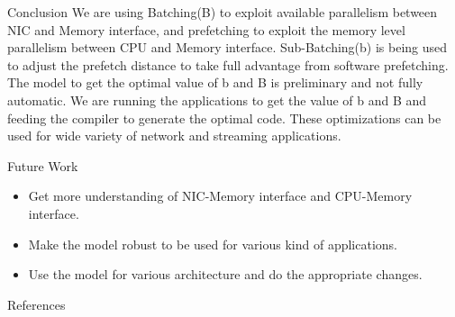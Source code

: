 \documentclass[final]{beamer}
\newlength{\onecolwid}
\begin{document}
\begin{frame}
\begin{columns}[t]
\begin{column}{\onecolwid}
\begin{exampleblock}{Conclusion}
We are using Batching(B) to exploit available parallelism between NIC and Memory interface, and prefetching to exploit the memory level parallelism between CPU and Memory interface.
Sub-Batching(b) is being used to adjust the prefetch distance to take full advantage from software prefetching. The model to get the optimal value of b and B is preliminary and not fully automatic. We are running the applications to get the value of b and B and feeding the compiler to generate the optimal code. These optimizations can be used for wide variety of network and streaming applications.
\end{exampleblock}


\begin{exampleblock}{Future Work}
\begin{itemize}
\item Get more understanding of NIC-Memory interface and CPU-Memory interface. 
\item Make the model robust to be used for various kind of applications.
\item Use the model for various architecture and do the appropriate changes.
\end{itemize}
\end{exampleblock}


\begin{exampleblock}{References}

\nocite{*} %
\small{
\vspace{1cm}}
\end{exampleblock}




\end{column}
\end{columns}
\end{frame}
\end{document}
